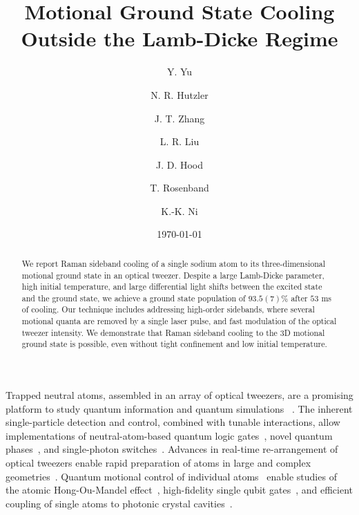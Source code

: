 \documentclass[aps,prl,twocolumn,groupedaddress]{revtex4-1}
\begin{document}
\title{Motional Ground State Cooling Outside the Lamb-Dicke Regime}
\author{Y. Yu}
\author{N. R. Hutzler}
\author{J. T. Zhang}
\author{L. R. Liu}
\author{J. D. Hood}
\author{T. Rosenband}
\author{K.-K. Ni}

\date{\today}

\begin{abstract}
  We report Raman sideband cooling of a single sodium atom to its three-dimensional
  motional ground state in an optical tweezer.
  Despite a large Lamb-Dicke parameter, high initial temperature, and
  large differential light shifts between the excited state and the ground state,
  we achieve a ground state population of $93.5(7)$\% after $53$ ms of cooling.
  Our technique includes addressing high-order sidebands,
  where several motional quanta are removed by a single laser pulse, and
  fast modulation of the optical tweezer intensity.
  We demonstrate that Raman sideband cooling to the 3D motional ground state is possible,
  even without tight confinement and low initial temperature.
\end{abstract}

\maketitle

Trapped neutral atoms, assembled in an array of optical tweezers,
are a promising platform to study quantum information and quantum simulations~
\cite{Schlosser2001,Weiss2004,Isenhower2010,Wilk2010,Kaufman2015,Labuhn2016,Murmann2015}.
The inherent single-particle detection and control, combined with tunable interactions,
allow implementations of neutral-atom-based quantum logic gates~\cite{Isenhower2010,Wilk2010},
novel quantum phases~\cite{Labuhn2016}, and single-photon switches~\cite{Dayan2008,Tiecke2014}.
Advances in real-time re-arrangement of optical tweezers enable rapid preparation of atoms
in large and complex geometries~\cite{Barredo2016,Endres2016}.
Quantum motional control of individual
atoms~\cite{Li2012,Kaufman2012,Thompson2013,Liu2017,Robens2017} enable
studies of the atomic Hong-Ou-Mandel effect~\cite{Kaufman2014},
high-fidelity single qubit gates~\cite{Wang2016},
and efficient coupling of single atoms to photonic crystal cavities~\cite{Thompson2013a}.
\end{document}
